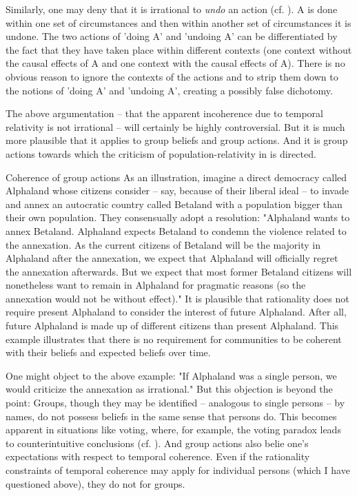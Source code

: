 Similarly, one may deny that it is irrational to \emph{undo} an action (cf. ). A is done within one set of circumstances and then within another set of circumstances it is undone. The two actions of 'doing A' and 'undoing A' can be differentiated by the fact that they have taken place within different contexts (one context without the causal effects of A and one context with the causal effects of A). There is no obvious reason to ignore the contexts of the actions and to strip them down to the notions of 'doing A' and 'undoing A', creating a possibly false dichotomy. 

The above argumentation -- that the apparent incoherence due to temporal relativity is not irrational -- will certainly be highly controversial. But it is much more plausible that it applies to group beliefs and group actions. And it is group actions towards which the criticism of population-relativity in  is directed. 

\begin{Example}{Coherence of group actions}{}
As an illustration, imagine a direct democracy called Alphaland whose citizens consider -- say, because of their liberal ideal -- to invade and annex an autocratic country called Betaland with a population bigger than their own population. They consensually adopt a resolution: "Alphaland wants to annex Betaland. Alphaland expects Betaland to condemn the violence related to the annexation. As the current citizens of Betaland will be the majority in Alphaland after the annexation, we expect that Alphaland will officially regret the annexation afterwards. But we expect that most former Betaland citizens will nonetheless want to remain in Alphaland for pragmatic reasons (so the annexation would not be without effect)." It is plausible that rationality does not require present Alphaland to consider the interest of future Alphaland. After all, future Alphaland is made up of different citizens than present Alphaland. This example illustrates that there is no requirement for communities to be coherent with their beliefs and expected beliefs over time. 
\end{Example}

One might object to the above example: "If Alphaland was a single person, we would criticize the annexation as irrational." But this objection is beyond the point: Groups, though they may be identified -- analogous to single persons -- by names, do not possess beliefs in the same sense that persons do. This becomes apparent in situations like voting, where, for example, the voting paradox leads to counterintuitive conclusions (cf. ). And group actions also belie one's expectations with respect to temporal coherence. Even if the rationality constraints of temporal coherence may apply for individual persons (which I have questioned above), they do not for groups. 

